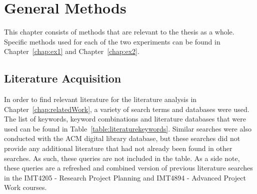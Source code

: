 \chapter{General Methods} \label{chap:generalmethods}
This chapter consists of methods that are relevant to the thesis as a whole. Specific methods used for each of the two experiments can be found in Chapter~\ref{chap:ex1} and Chapter~\ref{chap:ex2}. 

\section{Literature Acquisition}
In order to find relevant literature for the literature analysis in Chapter~\ref{chap:relatedWork}, a variety of search terms and databases were used. The list of keywords, keyword combinations and literature databases that were used can be found in Table~\ref{table:literaturekeywords}. 
Similar searches were also conducted with the ACM digital library database, but these searches did not provide any additional literature that had not already been found in other searches. As such, these queries are not included in the table. As a side note, these queries are a refreshed and combined version of previous literature searches in the IMT4205 - Research Project Planning and IMT4894 - Advanced Project Work courses. 

